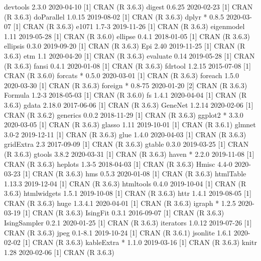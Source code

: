 \documentclass[a4paper,12pt]{article} %
\begin{document}
{\begin{Schunk}
\begin{Soutput}
 devtools         2.3.0      2020-04-10 [1] CRAN (R 3.6.3)
 digest           0.6.25     2020-02-23 [1] CRAN (R 3.6.3)
 doParallel       1.0.15     2019-08-02 [1] CRAN (R 3.6.3)
 dplyr          * 0.8.5      2020-03-07 [1] CRAN (R 3.6.3)
 e1071            1.7-3      2019-11-26 [1] CRAN (R 3.6.3)
 eigenmodel       1.11       2019-05-28 [1] CRAN (R 3.6.0)
 ellipse          0.4.1      2018-01-05 [1] CRAN (R 3.6.3)
 ellipsis         0.3.0      2019-09-20 [1] CRAN (R 3.6.3)
 Epi              2.40       2019-11-25 [1] CRAN (R 3.6.3)
 etm              1.1        2020-04-20 [1] CRAN (R 3.6.3)
 evaluate         0.14       2019-05-28 [1] CRAN (R 3.6.3)
 fansi            0.4.1      2020-01-08 [1] CRAN (R 3.6.3)
 fdrtool          1.2.15     2015-07-08 [1] CRAN (R 3.6.0)
 forcats        * 0.5.0      2020-03-01 [1] CRAN (R 3.6.3)
 foreach          1.5.0      2020-03-30 [1] CRAN (R 3.6.3)
 foreign        * 0.8-75     2020-01-20 [2] CRAN (R 3.6.3)
 Formula          1.2-3      2018-05-03 [1] CRAN (R 3.6.0)
 fs               1.4.1      2020-04-04 [1] CRAN (R 3.6.3)
 gdata            2.18.0     2017-06-06 [1] CRAN (R 3.6.3)
 GeneNet          1.2.14     2020-02-06 [1] CRAN (R 3.6.2)
 generics         0.0.2      2018-11-29 [1] CRAN (R 3.6.3)
 ggplot2        * 3.3.0      2020-03-05 [1] CRAN (R 3.6.3)
 glasso           1.11       2019-10-01 [1] CRAN (R 3.6.1)
 glmnet           3.0-2      2019-12-11 [1] CRAN (R 3.6.3)
 glue             1.4.0      2020-04-03 [1] CRAN (R 3.6.3)
 gridExtra        2.3        2017-09-09 [1] CRAN (R 3.6.3)
 gtable           0.3.0      2019-03-25 [1] CRAN (R 3.6.3)
 gtools           3.8.2      2020-03-31 [1] CRAN (R 3.6.3)
 haven          * 2.2.0      2019-11-08 [1] CRAN (R 3.6.3)
 heplots          1.3-5      2018-04-03 [1] CRAN (R 3.6.3)
 Hmisc            4.4-0      2020-03-23 [1] CRAN (R 3.6.3)
 hms              0.5.3      2020-01-08 [1] CRAN (R 3.6.3)
 htmlTable        1.13.3     2019-12-04 [1] CRAN (R 3.6.3)
 htmltools        0.4.0      2019-10-04 [1] CRAN (R 3.6.3)
 htmlwidgets      1.5.1      2019-10-08 [1] CRAN (R 3.6.3)
 httr             1.4.1      2019-08-05 [1] CRAN (R 3.6.3)
 huge             1.3.4.1    2020-04-01 [1] CRAN (R 3.6.3)
 igraph         * 1.2.5      2020-03-19 [1] CRAN (R 3.6.3)
 IsingFit         0.3.1      2016-09-07 [1] CRAN (R 3.6.3)
 IsingSampler     0.2.1      2020-01-25 [1] CRAN (R 3.6.3)
 iterators        1.0.12     2019-07-26 [1] CRAN (R 3.6.3)
 jpeg             0.1-8.1    2019-10-24 [1] CRAN (R 3.6.1)
 jsonlite         1.6.1      2020-02-02 [1] CRAN (R 3.6.3)
 kableExtra     * 1.1.0      2019-03-16 [1] CRAN (R 3.6.3)
 knitr            1.28       2020-02-06 [1] CRAN (R 3.6.3)

\end{Soutput}
\end{Schunk}}
\end{document}
